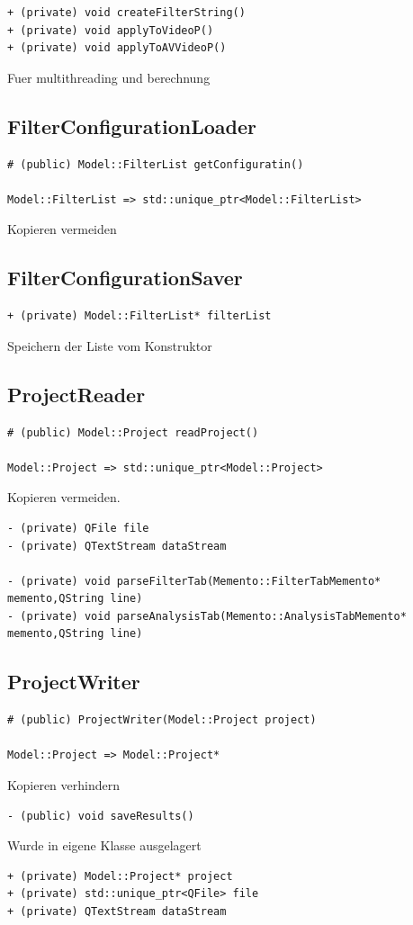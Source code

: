 \documentclass{scrartcl}
\begin{document}
{\begin{verbatim}
+ (private) void createFilterString()
+ (private) void applyToVideoP()
+ (private) void applyToAVVideoP()
\end{verbatim}
Fuer multithreading und berechnung
\subsection{FilterConfigurationLoader}
\begin{verbatim}
# (public) Model::FilterList getConfiguratin()

Model::FilterList => std::unique_ptr<Model::FilterList>
\end{verbatim}
Kopieren vermeiden
\subsection{FilterConfigurationSaver}
\begin{verbatim}
+ (private) Model::FilterList* filterList
\end{verbatim}
Speichern der Liste vom Konstruktor
\subsection{ProjectReader}
\begin{verbatim}
# (public) Model::Project readProject()

Model::Project => std::unique_ptr<Model::Project>
\end{verbatim}
Kopieren vermeiden.
\begin{verbatim}
- (private) QFile file
- (private) QTextStream dataStream

- (private) void parseFilterTab(Memento::FilterTabMemento* memento,QString line)
- (private) void parseAnalysisTab(Memento::AnalysisTabMemento* memento,QString line)
\end{verbatim}
\subsection{ProjectWriter}
\begin{verbatim}
# (public) ProjectWriter(Model::Project project)

Model::Project => Model::Project*
\end{verbatim}
Kopieren verhindern

\begin{verbatim}
- (public) void saveResults()
\end{verbatim}
Wurde in eigene Klasse ausgelagert
\begin{verbatim}
+ (private) Model::Project* project
+ (private) std::unique_ptr<QFile> file
+ (private) QTextStream dataStream
\end{verbatim}
}
\end{document}
